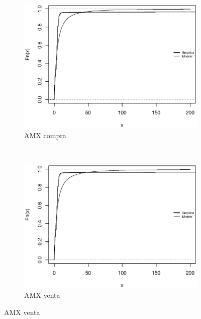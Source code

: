 \documentclass[11pt]{article}
\numberwithin{equation}{section} %
\begin{document}
\begin{figure}[htbp]
\centering
\begin{subfigure}[b]{0.5\textwidth}
\centering
\includegraphics[width=\textwidth, trim=0 0.5cm 0 1cm]{amxcanccompra.eps}
\caption{AMX compra}
\label{fig:amxvcanccompra}
\end{subfigure}%
~ %
\begin{subfigure}[b]{0.5\textwidth}
\centering
\includegraphics[width=\textwidth, trim=0 0.5cm 0 1cm]{amxcancventa.eps}
\caption{AMX venta}
\label{fig:amxcancventa}
\end{subfigure}


\end{figure}
\end{document}
